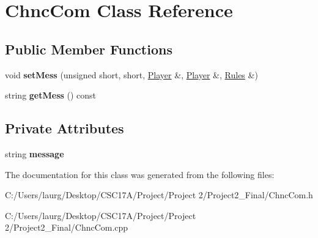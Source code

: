 \hypertarget{class_chnc_com}{}\section{Chnc\+Com Class Reference}
\label{class_chnc_com}
\subsection*{Public Member Functions}
\begin{DoxyCompactItemize}
\item 
\mbox{\label{class_chnc_com_a805553f0f31b25257b7edd2d964a6116}} 
void {\bfseries set\+Mess} (unsigned short, short, \hyperlink{class_player}{Player} \&, \hyperlink{class_player}{Player} \&, \hyperlink{class_rules}{Rules} \&)
\item 
\mbox{\label{class_chnc_com_ac6fb13e8c7133bbcde95263af389d11c}} 
string {\bfseries get\+Mess} () const
\end{DoxyCompactItemize}
\subsection*{Private Attributes}
\begin{DoxyCompactItemize}
\item 
\mbox{\label{class_chnc_com_afaff7e4cf04aa99b258b8121ef9d883a}} 
string {\bfseries message}
\end{DoxyCompactItemize}


The documentation for this class was generated from the following files\+:\begin{DoxyCompactItemize}
\item 
C\+:/\+Users/laurg/\+Desktop/\+C\+S\+C17\+A/\+Project/\+Project 2/\+Project2\+\_\+\+Final/Chnc\+Com.\+h\item 
C\+:/\+Users/laurg/\+Desktop/\+C\+S\+C17\+A/\+Project/\+Project 2/\+Project2\+\_\+\+Final/Chnc\+Com.\+cpp\end{DoxyCompactItemize}
